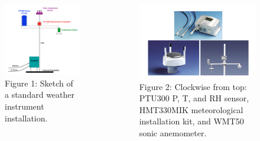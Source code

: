 \documentclass[12pt]{beamer}
\begin{document}
\begin{frame}
\begin{columns}
\begin{figure}
\includegraphics[scale=0.3]{Diagrama.png}\vspace*{10pt}
\captionsize\tiny Figure 1: Sketch of a standard weather instrument installation.
\label{Diagram}
\end{figure}
\begin{figure}
\includegraphics[scale=0.2]{Sensores.png}\vspace*{10pt}
\captionsize\tiny Figure 2: Clockwise from top: PTU300 P, T, and RH sensor, HMT330MIK meteorological installation kit, and WMT50 sonic anemometer.
\label{Sensor}
\end{figure}
\end{columns}
\end{frame}
\end{document}
